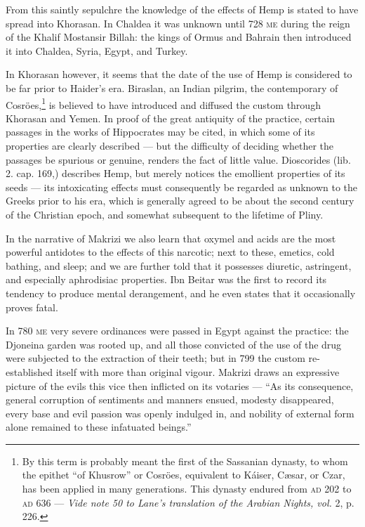 \documentclass[a4paper, 11pt, oneside, polutonikogreek, english]{article}
\begin{document}
From this saintly sepulchre the knowledge of the effects of Hemp is stated to have spread into Khorasan. In Chaldea it was unknown until 728 \textsc{me} during the reign of the Khalif Mostansir Billah: the kings of Ormus and Bahrain then introduced it into Chaldea, Syria, Egypt, and Turkey.

In Khorasan however, it seems that the date of the use of Hemp is considered to be far prior to Haider's era. Biraslan, an Indian pilgrim, the contemporary of Cosröes,\footnote{By this term is probably meant the first of the Sassanian dynasty, to whom the epithet ``of Khusrow'' or Cosröes, equivalent to Káiser, Cæsar, or Czar, has been applied in many generations. This dynasty endured from \textsc{ad} 202 to \textsc{ad} 636 --- \emph{Vide note 50 to Lane's translation of the Arabian Nights, vol.} 2, p. 226.} is believed to have introduced and diffused the custom through Khorasan and Yemen. In proof of the great antiquity of the practice, certain passages in the works of Hippocrates may be cited, in which some of its properties are clearly described --- but the difficulty of deciding whether the passages be spurious or genuine, renders the fact of little value. Dioscorides (lib. 2. cap. 169,) describes Hemp, but merely notices the emollient properties of its seeds --- its intoxicating effects must consequently be regarded as unknown to the Greeks prior to his era, which is generally agreed to be about the second century of the Christian epoch, and somewhat subsequent to the lifetime of Pliny.

In the narrative of Makrizi we also learn that oxymel and acids are the most powerful antidotes to the effects of this narcotic; next to these, emetics, cold bathing, and sleep; and we are further told that it possesses diuretic, astringent, and especially aphrodisiac properties. Ibn Beitar was the first to record its tendency to produce mental derangement, and he even states that it occasionally proves fatal.

In 780 \textsc{me} very severe ordinances were passed in Egypt against the practice: the Djoneina garden was rooted up, and all those convicted of the use of the drug were subjected to the extraction of their teeth; but in 799 the custom re-established itself with more than original vigour. Makrizi draws an expressive picture of the evils this vice then inflicted on its votaries --- ``As its consequence, general corruption of sentiments and manners ensued, modesty disappeared, every base and evil passion was openly indulged in, and nobility of external form alone remained to these infatuated beings.''
\clearpage
\end{document}
